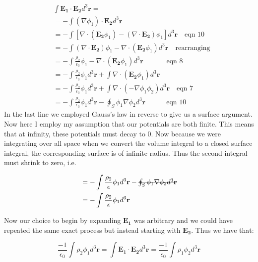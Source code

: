\documentclass[a4paper, 11pt]{article}
\begin{document}
\begin{align*}
	&\int \mathbf{E_1} \cdot \mathbf{E_2}  d^3\mathbf{r} = \\ 
	&= - \int (\nabla \phi_1) \cdot \mathbf{E_2} d^3\mathbf{r} \\ 
	&= - \int [\nabla \cdot (\mathbf{E_2}\phi_1)-(\nabla \cdot \mathbf{E_2})\phi_1] d^3\mathbf{r} \quad \mbox{eqn 10} \\ 
	&= - \int (\nabla \cdot \mathbf{E_2})\phi_1 - \nabla \cdot (\mathbf{E_2}\phi_1) d^3\mathbf{r} \quad \mbox{rearranging}\\ 
	&= -\int \frac{\rho_2}{\epsilon_0}\phi_1 - \nabla \cdot (\mathbf{E_2}\phi_1) d^3\mathbf{r}  \quad \quad \quad \mbox{ eqn 8}\\ 
	&= - \int \frac{\rho_2}{\epsilon_0}\phi_1 d^3\mathbf{r} + \int \nabla \cdot (\mathbf{E_2}\phi_1) d^3 \mathbf{r} \\
	&= - \int \frac{\rho_2}{\epsilon_0}\phi_1 d^3\mathbf{r} + \int \nabla \cdot (-\nabla \phi_1 \phi_2) d^3\mathbf{r} \quad \mbox{eqn 7} \\ 
	&= -\int \frac{\rho_2}{\epsilon_0}\phi_1d^3\mathbf{r} - \oint_S \phi_1 \nabla\phi_2 d^3\mathbf{r} \quad \quad \quad \mbox{eqn 10}
\end{align*}
In the last line we employed Gauss's law in reverse to give us a surface argument. Now here I employ my assumption that our potentials are both finite. This means that at infinity, these potentials must decay to 0. Now because we were integrating over all space when we convert the volume integral to a closed surface integral, the corresponding surface is of infinite radius. Thus the second integral must shrink to zero, i.e. 

\begin{align*}
	&= -\int \frac{\rho_2}{\epsilon}\phi_1 d^3\mathbf{r} - \mbox{\sout{$\oint_S \phi_1 \nabla\phi_2 d^3\mathbf{r}$}} \\ 
	&= -\int \frac{\rho_2}{\epsilon}\phi_1 d^3\mathbf{r} 
\end{align*} 

Now our choice to begin by expanding $\mathbf{E_1}$ was arbitrary and we could have repeated the same exact process but instead starting with $\mathbf{E_2}$. Thus we have that: 

\begin{equation}
	\frac{-1}{\epsilon_0} \int \rho_2 \phi_1 d^3\mathbf{r} = \int \mathbf{E_1} \cdot \mathbf{E_2} d^3\mathbf{r} = \frac{-1}{\epsilon_0} \int \rho_1 \phi_2 d^3\mathbf{r} 
\end{equation}
\end{document}
